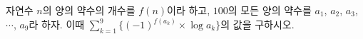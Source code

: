 \hspace*{2mm}\begin{minipage}[t]{\dimexpr\linewidth-2mm\relax}\vspace{0pt}
자연수 $n$의 양의 약수의 개수를 $f(n)$이라 하고, $100$의 모든 양의 약수를 $a_1$, $a_2$, $a_3$, $\cdots$, $a_9$라 하자. 이때 $\displaystyle\sum_{k=1}^{9}\{(-1)^{f(a_k)}\times\log a_k\}$의 값을 구하시오.\end{minipage}
